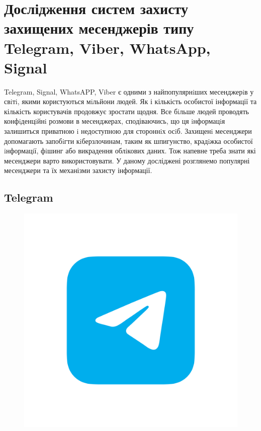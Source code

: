 \chapter{Дослідження систем захисту захищених месенджерів типу Telegram, Viber, WhatsApp, Signal}

Telegram, Signal, WhatsAPP, Viber є одними з найпопулярнiших месенджерiв у свiтi, якими користуються мiльйони людей. Як і кількість особистої інформації та кількість користувачів продовжує зростати щодня. Все бiльше людей проводять конфiденцiйнi розмови в месенджерах, сподіваючись, що ця iнформацiя залишиться приватною i недоступною для стороннiх осiб. Захищенi месенджери допомагають запобiгти кiберзлочинам, таким як шпигунство, крадiжка особистої iнформацiї, фiшинг або викрадення облiкових даних. Тож напевне треба знати які месенджери варто використовувати. У даному досліджені розглянемо популярні месенджери та їх механізми захисту інформації.

\section{Telegram}

\begin{figure}
    \includegraphics[width=0.9\linewidth]{../IMAGES/telegram.png} 
    \label{fig:telegram}
\end{figure}

